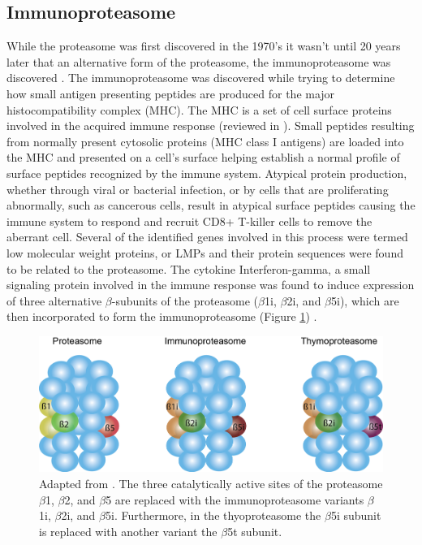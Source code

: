 \subsection{Immunoproteasome}
While the proteasome was first discovered in the 1970's it wasn't until 20 years later that an alternative form of the proteasome, the immunoproteasome was discovered \citep{brown91, glynne91, ortiz-navarrete91}. The immunoproteasome was discovered while trying to determine how small antigen presenting peptides are produced for the major histocompatibility complex (MHC). The MHC is a set of cell surface proteins involved in the acquired immune response (reviewed in \citep{neefjes11}). Small peptides resulting from normally present cytosolic proteins (MHC class I antigens) are loaded into the MHC and presented on a cell's surface helping establish a normal profile of surface peptides recognized by the immune system. Atypical protein production, whether through viral or bacterial infection, or by cells that are proliferating abnormally, such as cancerous cells, result in atypical surface peptides causing the immune system to respond and recruit CD8+ T-killer cells to remove the aberrant cell. Several of the identified genes involved in this process were termed low molecular weight proteins, or LMPs and their protein sequences were found to be related to the proteasome. The cytokine Interferon-gamma, a small signaling protein involved in the immune response was found to induce expression of three alternative $\beta$-subunits of the proteasome ($\beta$1i, $\beta$2i, and $\beta$5i), which are then incorporated to form the immunoproteasome (Figure \ref{fig:proteasomeisotypes}) \citep{aki94, groettrup96}.

\begin{figure}[p]
	\centering
	\includegraphics[width=\columnwidth]{intro/proteasome_isotypes.png}
	{Adapted from \citep{groettrup09}. The three catalytically active sites of the proteasome $\beta$1, $\beta$2, and $\beta$5 are replaced with the immunoproteasome variants $\beta$1i, $\beta$2i, and $\beta$5i. Furthermore, in the thyoproteasome the $\beta$5i subunit is replaced with another variant the $\beta$5t subunit.}
	\label{fig:proteasomeisotypes}
\end{figure}

